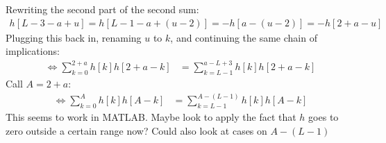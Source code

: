 \documentclass[a4paper]{article}
\begin{document}
Rewriting the second part of the second sum:
\begin{align*}
h[L-3-a+u] = h[L-1-a+(u-2)] = -h[a-(u-2)] = -h[2+a-u]
\end{align*}
Plugging this back in, renaming $u$ to $k$, and continuing the same chain of implications:
\begin{align*}
\iff \sum_{k=0}^{2+a}h[k]h[2+a-k] &= \sum_{k=L-1}^{a-L+3}h[k]h[2+a-k]
\end{align*}
Call $A = 2+a$:
\begin{align*}
\iff \sum_{k=0}^{A}h[k]h[A-k] &= \sum_{k=L-1}^{A-(L-1)}h[k]h[A-k]
\end{align*}
This seems to work in MATLAB. Maybe look to apply the fact that $h$ goes to zero outside a certain range now? Could also look at cases on $A-(L-1)$
\end{document}
